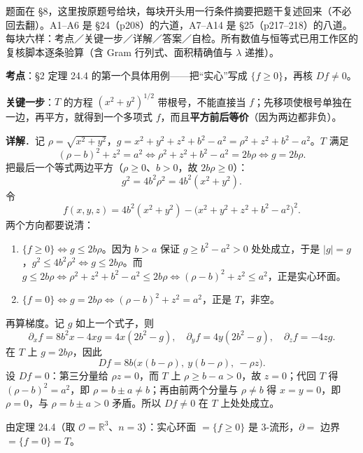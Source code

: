 \documentclass[11pt]{ctexart}
\renewcommand{\qbreak}{\needspace{0.22\textheight}}
\begin{document}
\newpage
{}

题面在 §8，这里按原题号给块，每块开头用一行条件摘要把题干复述回来（不必回去翻）。A1--A6 是 §24（p208）的六道，A7--A14 是 §25（p217--218）的八道。每块六样：考点／关键一步／详解／答案／自检。所有数值与恒等式已用工作区的复核脚本逐条验算（含 Gram 行列式、面积精确值与 $\lambda$ 递推）。

\qbreak
{}\label{ax1}

\textbf{考点}：§2 定理 24.4 的第一个具体用例——把“实心”写成 $\{f\ge0\}$，再核 $Df\ne0$。

\textbf{关键一步}：$T$ 的方程 $(x^2+y^2)^{1/2}$ 带根号，不能直接当 $f$；先移项使根号单独在一边，再平方，就得到一个多项式 $f$，而且\textbf{平方前后等价}（因为两边都非负）。

\textbf{详解}．记 $\rho=\sqrt{x^2+y^2}$，$g=x^2+y^2+z^2+b^2-a^2=\rho^2+z^2+b^2-a^2$。$T$ 满足
\[ (\rho-b)^2+z^2=a^2\iff \rho^2+z^2+b^2-a^2=2b\rho\iff g=2b\rho. \]
把最后一个等式两边平方（$\rho\ge0$、$b>0$，故 $2b\rho\ge0$）：
\[ g^2=4b^2\rho^2=4b^2(x^2+y^2). \]
令
\[ f(x,y,z)=4b^2(x^2+y^2)-\bigl(x^2+y^2+z^2+b^2-a^2\bigr)^2. \]
两个方向都要说清：
\begin{enumerate}
  \item $\{f\ge0\}\iff g\le2b\rho$。因为 $b>a$ 保证 $g\ge b^2-a^2>0$ 处处成立，于是 $|g|=g$，$g^2\le4b^2\rho^2\iff g\le2b\rho$。而
  $g\le2b\rho\iff\rho^2+z^2+b^2-a^2\le2b\rho\iff(\rho-b)^2+z^2\le a^2$，正是实心环面。
  \item $\{f=0\}\iff g=2b\rho\iff(\rho-b)^2+z^2=a^2$，正是 $T$，非空。
\end{enumerate}
再算梯度。记 $g$ 如上一个式子，则
\[ \partial_xf=8b^2x-4xg=4x(2b^2-g),\quad \partial_yf=4y(2b^2-g),\quad \partial_zf=-4zg. \]
在 $T$ 上 $g=2b\rho$，因此
\[ Df=8b\bigl(x(b-\rho),\ y(b-\rho),\ -\rho z\bigr). \]
设 $Df=0$：第三分量给 $\rho z=0$，而 $T$ 上 $\rho\ge b-a>0$，故 $z=0$；代回 $T$ 得 $(\rho-b)^2=a^2$，即 $\rho=b\pm a\ne b$；再由前两个分量与 $\rho\ne b$ 得 $x=y=0$，即 $\rho=0$，与 $\rho=b\pm a>0$ 矛盾。所以 $Df\ne0$ 在 $T$ 上处处成立。

由定理 24.4（取 $\mathcal{O}=\mathbb{R}^3$、$n=3$）：实心环面 $=\{f\ge0\}$ 是 3-流形，$\partial=$ 边界 $=\{f=0\}=T$。
\end{document}
